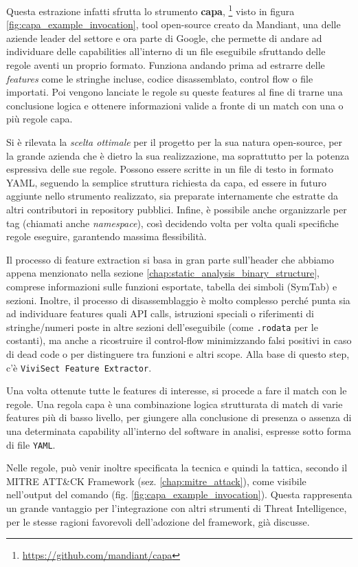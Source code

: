 Questa estrazione infatti sfrutta lo strumento \textbf{capa},
\footnote{\url{https://github.com/mandiant/capa}}
visto in figura \ref{fig:capa_example_invocation},
tool open-source creato da Mandiant, una delle aziende leader del settore e ora parte di Google,
che permette di andare ad individuare delle capabilities all'interno di un file eseguibile
sfruttando delle regole aventi un proprio formato.
Funziona andando prima ad estrarre delle \emph{features} come le stringhe incluse, codice disassemblato, control flow o file importati.
Poi vengono lanciate le regole su queste features al fine di trarne una conclusione logica e ottenere informazioni valide a fronte di un match con una o più regole capa.

Si è rilevata la \emph{scelta ottimale} per il progetto per la sua natura open-source, per la grande azienda che è dietro la sua realizzazione, ma soprattutto per la potenza espressiva delle sue regole.
Possono essere scritte in un file di testo in formato YAML, seguendo la semplice struttura richiesta da capa, ed essere in futuro aggiunte nello strumento realizzato, sia preparate internamente che estratte da altri contributori in repository pubblici. Infine, è possibile anche organizzarle per tag (chiamati anche \emph{namespace}), così decidendo volta per volta quali specifiche regole eseguire, garantendo massima flessibilità.

Il processo di feature extraction si basa in gran parte sull'header che abbiamo appena menzionato nella sezione \ref{chap:static_analysis_binary_structure}, comprese informazioni sulle funzioni esportate, tabella dei simboli (SymTab) e sezioni. Inoltre, il processo di disassemblaggio è molto complesso perché punta sia ad individuare features quali API calls, istruzioni speciali o riferimenti di stringhe/numeri poste in altre sezioni dell'eseguibile (come \texttt{.rodata} per le costanti), ma anche a ricostruire il control-flow minimizzando falsi positivi in caso di dead code o per distinguere tra funzioni e altri scope. Alla base di questo step, c'è \texttt{ViviSect Feature Extractor}. \cite{capa_mandiant_blogpost}

Una volta ottenute tutte le features di interesse, si procede a fare il match con le regole.
Una regola capa è una combinazione logica strutturata di match di varie features più di basso livello, per giungere alla conclusione di presenza o assenza di una determinata capability all'interno del software in analisi, espresse sotto forma di file \texttt{YAML}.

Nelle regole, può venir inoltre specificata la tecnica e quindi la tattica, secondo il MITRE ATT\&CK Framework (sez. \ref{chap:mitre_attack}), come visibile nell'output del comando (fig. \ref{fig:capa_example_invocation}).
Questa rappresenta un grande vantaggio per l'integrazione con altri strumenti di Threat Intelligence, per le stesse ragioni favorevoli dell'adozione del framework, già discusse.

